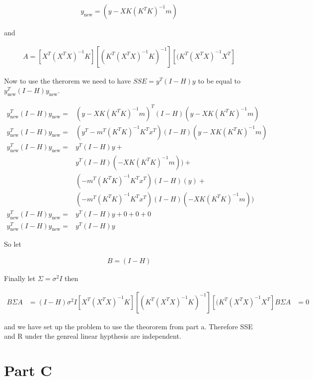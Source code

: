 \documentclass[]{book}
\begin{document}
\begin{align}
  y_{\text{new}} = ( y - X K (K^T K)^{-1} m )
\end{align}

and

\begin{align}
  A = [ X^T (X^T X)^{-1} K ] [ (K^T (X^T X)^{-1} K)^{-1} ] [ (K^T (X^T X)^{-1} X^T]
\end{align}

Now to use the therorem we need to have \(SSE = y^T (I-H) y\) to be equal to \(y_{\text{new}}^T (I-H) y_{\text{new}}\).

\begin{align}
  y_{\text{new}}^T (I-H) y_{\text{new}} =& ( y - X K (K^T K)^{-1} m )^T (I-H) ( y - X K (K^T K)^{-1} m ) \\
  y_{\text{new}}^T (I-H) y_{\text{new}} =& ( y^T - m^T(K^T K)^{-1} K^T x^T ) (I-H) ( y - X K (K^T K)^{-1} m ) \\
  y_{\text{new}}^T (I-H) y_{\text{new}} =& y^T (I-H) y + \\
  & y^T (I-H) (- X K (K^T K)^{-1} m )) + \\
  & (-m^T(K^T K)^{-1} K^T x^T ) (I-H) ( y ) + \\
  & (-m^T(K^T K)^{-1} K^T x^T ) (I-H)(- X K (K^T K)^{-1} m ))\\
  y_{\text{new}}^T (I-H) y_{\text{new}} =& y^T (I-H) y + 0 + 0 + 0\\
   y_{\text{new}}^T (I-H) y_{\text{new}} =& y^T (I-H) y
\end{align}

So let

\begin{align}
  B = (I - H)
\end{align}

Finally let \(\Sigma = \sigma^2 I\) then

\begin{align}
  B \Sigma A &= (I - H) \sigma^2 I [ X^T (X^T X)^{-1} K ] [ (K^T (X^T X)^{-1} K)^{-1} ] [ (K^T (X^T X)^{-1} X^T]
  B \Sigma A &= 0
\end{align}

and we have set up the problem to use the theororem from part a. Therefore SSE and R under the genreal linear hypthesis are independent.

\hypertarget{part-c}{%
\section{Part C}\label{part-c}}
\end{document}
